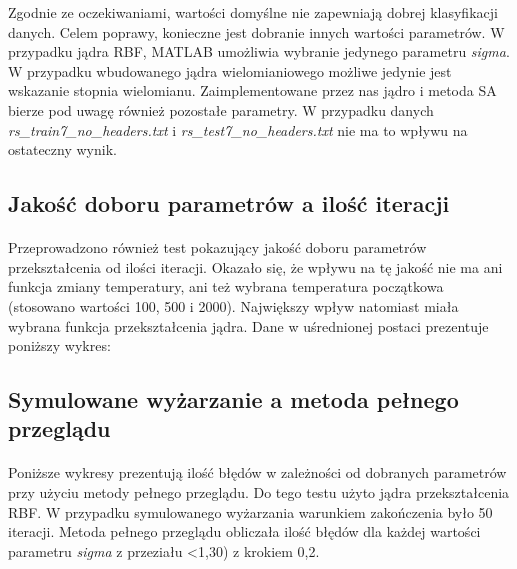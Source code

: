 \documentclass{article}
\begin{document}
Zgodnie ze oczekiwaniami, wartości domyślne nie zapewniają dobrej klasyfikacji danych. Celem poprawy, konieczne jest dobranie innych wartości parametrów. W przypadku jądra RBF, MATLAB umożliwia wybranie jedynego parametru \textit{sigma}. W przypadku wbudowanego jądra wielomianiowego możliwe jedynie jest wskazanie stopnia wielomianu. Zaimplementowane przez nas jądro i metoda SA bierze pod uwagę również pozostałe parametry. W przypadku danych \textit{rs\_train7\_no\_headers.txt} i \textit{rs\_test7\_no\_headers.txt} nie ma to wpływu na ostateczny wynik.

\subsection{Jakość doboru parametrów a ilość iteracji}
\paragraph{}
Przeprowadzono również test pokazujący jakość doboru parametrów przekształcenia od ilości iteracji. Okazało się, że wpływu na tę jakość nie ma ani funkcja zmiany temperatury, ani też wybrana temperatura początkowa (stosowano wartości 100, 500 i 2000). Największy wpływ natomiast miała wybrana funkcja przekształcenia jądra. Dane w uśrednionej postaci prezentuje poniższy wykres:

\pgfplotsset{width=7cm,compat=1.4}
\begin{center}
\end{center}

\subsection{Symulowane wyżarzanie a metoda pełnego przeglądu}
\paragraph{}
Poniższe wykresy prezentują ilość błędów w zależności od dobranych parametrów przy użyciu metody pełnego  przeglądu. Do tego testu użyto jądra przekształcenia RBF. W przypadku symulowanego wyżarzania warunkiem zakończenia było 50 iteracji. Metoda pełnego przeglądu obliczała ilość błędów dla każdej wartości parametru \textit{sigma} z przeziału <1,30) z krokiem 0,2.
\end{document}
